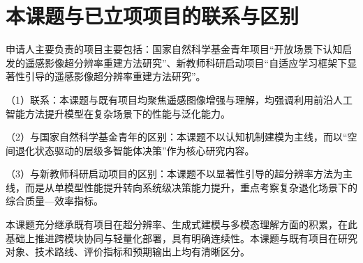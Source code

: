 \section{本课题与已立项项目的联系与区别}

申请人主要负责的项目主要包括：国家自然科学基金青年项目“开放场景下认知启发的遥感影像超分辨率重建方法研究”、新教师科研启动项目“自适应学习框架下显著性引导的遥感影像超分辨率重建方法研究”。

（1）联系：本课题与既有项目均聚焦遥感图像增强与理解，均强调利用前沿人工智能方法提升模型在复杂场景下的性能与泛化能力。

（2）与国家自然科学基金青年的区别：本课题不以认知机制建模为主线，而以“空间退化状态驱动的层级多智能体决策”作为核心研究内容。  

（3）与新教师科研启动项目的区别：本课题不以显著性引导的超分辨率方法为主线，而是从单模型性能提升转向系统级决策能力提升，重点考察复杂退化场景下的综合质量—效率指标。

本课题充分继承既有项目在超分辨率、生成式建模与多模态理解方面的积累，在此基础上推进跨模块协同与轻量化部署，具有明确连续性。本课题与既有项目在研究对象、技术路线、评价指标和预期输出上均有清晰区分。

\vspace{28em}